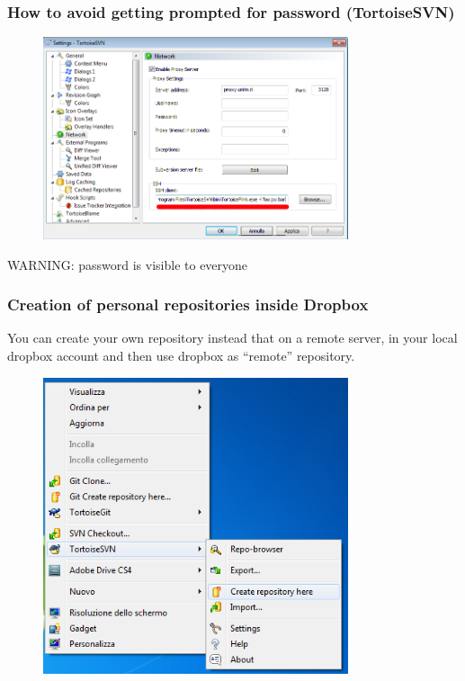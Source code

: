 \documentclass[10pt]{beamer}
\begin{document}
\begin{frame}[fragile]
\frametitle{How to avoid getting prompted for password (TortoiseSVN)}
\begin{figure}[h]
 \centering
 \includegraphics[width=0.8\textwidth]{images/image16.png}
\end{figure}
WARNING: password is visible to everyone
\end{frame}

\begin{frame}[fragile]
\frametitle{Creation of personal repositories inside Dropbox}
You can create your own repository instead that on a remote server, in your local dropbox account and then use dropbox as ``remote'' repository.
\begin{figure}[h]
 \centering
 \includegraphics[width=0.8\textwidth]{images/image17.png}
\end{figure}
\end{frame}
\end{document}
